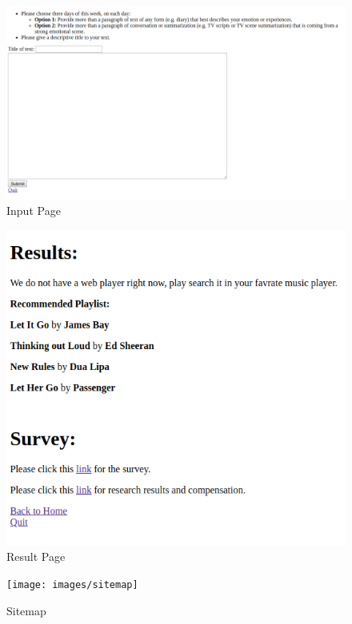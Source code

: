 \begin{figure}[htbp]
\centering
\includegraphics[width=6 in]{images/input}
\caption{Input Page}
\label{input}
\end{figure}

\begin{figure}[htbp]
\centering
\includegraphics[width=6 in]{images/result}
\caption{Result Page}
\label{result}
\end{figure}

\begin{figure}[htbp]
\centering
\texttt{[image: images/sitemap]}
\caption{Sitemap}
\label{sitemap}
\end{figure}
